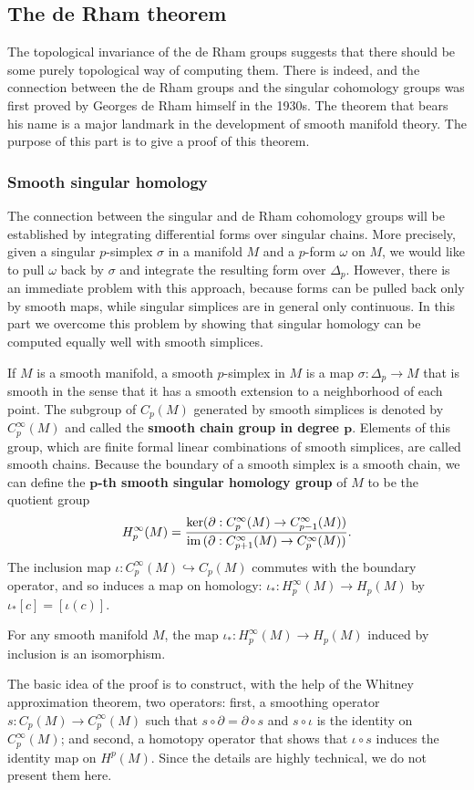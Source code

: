 \subsection{The de Rham theorem}
The topological invariance of the de Rham groups suggests that there should be some purely topological way of computing them. There is indeed, and the connection 
between the de Rham groups and the singular cohomology groups was first proved by Georges de Rham himself in the 1930s. The theorem that bears his name is a major 
landmark in the development of smooth manifold theory. The purpose of this part is to give a proof of this theorem.
\subsubsection{Smooth singular homology}
The connection between the singular and de Rham cohomology groups will be established by integrating differential forms over singular chains. More precisely, given a 
singular $p$-simplex $\sigma$ in a manifold $M$ and a $p$-form $\omega$ on $M$, we would like to pull $\omega$ back by $\sigma$ and integrate the resulting form over 
$\Delta_p$. However, there is an immediate problem with this approach, because forms can be pulled back only by smooth maps, while singular simplices are in general 
only continuous. In this part we overcome this problem by showing that singular homology can be computed equally well with smooth simplices.\par
If $M$ is a smooth manifold, a smooth $p$-simplex in $M$ is a map $\sigma:\Delta_p\to M$ that is smooth in the sense that it has a smooth extension to a neighborhood 
of each point. The subgroup of $C_p(M)$ generated by smooth simplices is denoted by $C^\infty_p(M)$ and called the \textbf{smooth chain group in degree $\bm{p}$}. 
Elements of this group, which are finite formal linear combinations of smooth simplices, are called smooth chains. Because the boundary of a smooth simplex is a smooth 
chain, we can define the \textbf{$\bm{p}$-th smooth singular homology group} of $M$ to be the quotient group
\[H_p^{\infty}(M)=\frac{\ker(\partial:C_p^{\infty}(M)\to C_{p-1}^{\infty}(M))}{\mathrm{im}\,(\partial:C_{p+1}^{\infty}(M)\to C_{p}^{\infty}(M))}.\]
The inclusion map $\iota:C^\infty_p(M)\hookrightarrow C_p(M)$ commutes with the boundary operator, and so induces a map on homology: $\iota_*:H_p^{\infty}(M)\to H_p(M)$ 
by $\iota_*[c]=[\iota(c)]$.
\begin{theorem}
For any smooth manifold $M$, the map $\iota_*:H_p^{\infty}(M)\to H_p(M)$ induced by inclusion is an isomorphism.
\end{theorem}
The basic idea of the proof is to construct, with the help of the Whitney approximation theorem, two operators: first, a smoothing operator $s:C_p(M)\to C_p^{\infty}(M)$ 
such that $s\circ\partial=\partial\circ s$ and $s\circ\iota$ is the identity on $C_p^{\infty}(M)$; and second, a homotopy operator that shows that $\iota\circ s$ induces 
the identity map on $H^p(M)$. Since the details are highly technical, we do not present them here.
